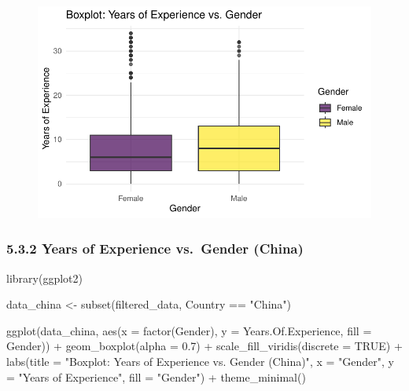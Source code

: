 \documentclass[
  letterpaper,
  DIV=11,
  numbers=noendperiod]{scrartcl}
\newenvironment{Shaded}{\begin{snugshade}}{\end{snugshade}}
\newcommand{\AttributeTok}[1]{\textcolor[rgb]{0.40,0.45,0.13}{#1}}
\newcommand{\ConstantTok}[1]{\textcolor[rgb]{0.56,0.35,0.01}{#1}}
\newcommand{\FloatTok}[1]{\textcolor[rgb]{0.68,0.00,0.00}{#1}}
\newcommand{\FunctionTok}[1]{\textcolor[rgb]{0.28,0.35,0.67}{#1}}
\newcommand{\NormalTok}[1]{\textcolor[rgb]{0.00,0.23,0.31}{#1}}
\newcommand{\OtherTok}[1]{\textcolor[rgb]{0.00,0.23,0.31}{#1}}
\newcommand{\SpecialCharTok}[1]{\textcolor[rgb]{0.37,0.37,0.37}{#1}}
\newcommand{\StringTok}[1]{\textcolor[rgb]{0.13,0.47,0.30}{#1}}
\begin{document}
\begin{figure}[H]

{\centering \includegraphics{main_doc_files/figure-pdf/unnamed-chunk-53-1.pdf}

}

\end{figure}

\hypertarget{years-of-experience-vs.-gender-china}{%
\subsubsection{5.3.2 Years of Experience vs.~Gender
(China)}\label{years-of-experience-vs.-gender-china}}

\begin{Shaded}
\begin{Highlighting}[]
\FunctionTok{library}\NormalTok{(ggplot2)}

\NormalTok{data\_china }\OtherTok{\textless{}{-}} \FunctionTok{subset}\NormalTok{(filtered\_data, Country }\SpecialCharTok{==} \StringTok{"China"}\NormalTok{)}

\FunctionTok{ggplot}\NormalTok{(data\_china, }\FunctionTok{aes}\NormalTok{(}\AttributeTok{x =} \FunctionTok{factor}\NormalTok{(Gender), }\AttributeTok{y =}\NormalTok{ Years.Of.Experience, }\AttributeTok{fill =}\NormalTok{ Gender)) }\SpecialCharTok{+}
  \FunctionTok{geom\_boxplot}\NormalTok{(}\AttributeTok{alpha =} \FloatTok{0.7}\NormalTok{) }\SpecialCharTok{+}
  \FunctionTok{scale\_fill\_viridis}\NormalTok{(}\AttributeTok{discrete =} \ConstantTok{TRUE}\NormalTok{) }\SpecialCharTok{+}
  \FunctionTok{labs}\NormalTok{(}\AttributeTok{title =} \StringTok{"Boxplot: Years of Experience vs. Gender (China)"}\NormalTok{,}
       \AttributeTok{x =} \StringTok{"Gender"}\NormalTok{,}
       \AttributeTok{y =} \StringTok{"Years of Experience"}\NormalTok{,}
       \AttributeTok{fill =} \StringTok{"Gender"}\NormalTok{) }\SpecialCharTok{+}
  \FunctionTok{theme\_minimal}\NormalTok{()}
\end{Highlighting}
\end{Shaded}
\end{document}
